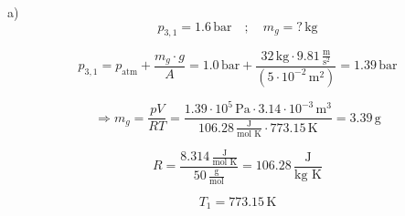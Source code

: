 a) \\
\[ p_{3,1} = 1.6 \, \text{bar} \quad ; \quad m_g = ? \, \text{kg} \]

\[ p_{3,1} = p_{\text{atm}} + \frac{m_g \cdot g}{A} = 1.0 \, \text{bar} + \frac{32 \, \text{kg} \cdot 9.81 \, \frac{\text{m}}{\text{s}^2}}{(5 \cdot 10^{-2} \, \text{m}^2)} = 1.39 \, \text{bar} \]

\[
\Rightarrow m_g = \frac{pV}{RT} = \frac{1.39 \cdot 10^5 \, \text{Pa} \cdot 3.14 \cdot 10^{-3} \, \text{m}^3}{106.28 \, \frac{\text{J}}{\text{mol K}} \cdot 773.15 \, \text{K}} = 3.39 \, \text{g}
\]

\[
R = \frac{8.314 \, \frac{\text{J}}{\text{mol K}}}{50 \, \frac{\text{g}}{\text{mol}}} = 106.28 \, \frac{\text{J}}{\text{kg K}}
\]

\[
T_1 = 773.15 \, \text{K}
\]